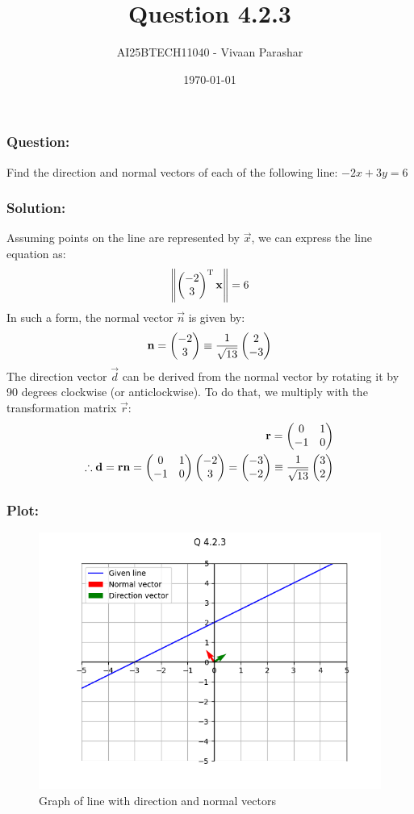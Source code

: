 \documentclass{beamer}
\title{Question 4.2.3}
\author{AI25BTECH11040 - Vivaan Parashar}
\date{\today}
\begin{document}
\frame{\titlepage}

\begin{frame}
    \frametitle{Question: }
    Find the direction and normal vectors of each of the following line: $-2x + 3y = 6$
\end{frame}

\begin{frame}
    \frametitle{Solution: }
    Assuming points on the line are represented by $\vec{x}$, we can express the line equation as:
    \begin{align}
        \left\lVert\begin{pmatrix}-2 \\ 3\end{pmatrix}^{\mathrm{T}}\mathbf{x}\right\rVert = 6
    \end{align}
    In such a form, the normal vector $\vec{n}$ is given by:
    \begin{align}
        \mathbf{n} = \begin{pmatrix}-2 \\ 3\end{pmatrix} \equiv \frac{1}{\sqrt{13}}\begin{pmatrix}2 \\ -3\end{pmatrix}
    \end{align}
    The direction vector $\vec{d}$ can be derived from the normal vector by rotating it by 90 degrees clockwise (or anticlockwise). To do that, we multiply with the transformation matrix $\vec{r}$:
    \begin{align}
        \mathbf{r} = \begin{pmatrix}0                             & 1 \\ -1 & 0\end{pmatrix}\\
        \therefore \mathbf{d} = \mathbf{r}\mathbf{n} = \begin{pmatrix}0 & 1 \\ -1 & 0\end{pmatrix}\begin{pmatrix}-2 \\ 3\end{pmatrix} = \begin{pmatrix}-3 \\ -2\end{pmatrix} \equiv \frac{1}{\sqrt{13}}\begin{pmatrix}3 \\ 2\end{pmatrix}
    \end{align}
\end{frame}

\begin{frame}
    \frametitle{Plot: }
    \begin{figure}[h!]
        \centering
        \includegraphics[width=0.9\columnwidth]{../figs/plot.png}
        \caption{Graph of line with direction and normal vectors}
        \label{fig:4.2.3}
    \end{figure}
\end{frame}
\end{document}
